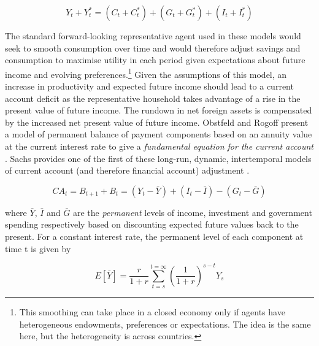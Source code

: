 \documentclass[12pt, a4paper, oneside]{article}\usepackage[]{graphicx}\usepackage[]{color}
\begin{document}
 \begin{equation} 
Y_t+Y^*_t=(C_t+C^*_t) + (G_t +G^*_t)+(I_t +I^*_t) 
\end{equation}

The standard forward-looking representative agent used in these models would seek to smooth consumption over time and would therefore adjust savings and consumption to maximise utility in each period given expectations about future income and evolving preferences.\footnote{This smoothing can take place in a closed economy only if agents have heterogeneous endowments, preferences or expectations.  The idea is the same here, but the heterogeneity is across countries.}  Given the assumptions of this model, an increase in productivity and expected future income should lead to a current account deficit as the representative household takes advantage of a rise in the present value of future income.  The rundown in net foreign assets is compensated by the increased net present value of future income.  Obstfeld and Rogoff present a model of permanent balance of payment components based on an annuity value at the current interest rate to give a \emph{fundamental equation for the current account} \citep[p. 74]{OandR}.
Sachs provides one of the first of these long-run, dynamic, intertemporal models of current account (and therefore financial account) adjustment \citep{SachsCA}.  

\begin{equation} 
CA_t=B_{t+1}+B_t=(Y_t-\bar{Y})+(I_t-\bar{I})-(G_t-\bar{G}) 
\end{equation} 

where $\bar{Y}$, $\bar{I}$ and $\bar{G}$ are the \emph{permanent} levels of income, investment and government spending respectively based on discounting expected future values back to the present. For a constant interest rate, the permanent level of each component at time t is given by   

 \begin{equation} 
E[\bar{Y}]=\frac{r}{1+r}\sum_{t=s}^{t=\infty}\left (\frac{1}{1+r}\right)^{s-t}Y_s 
\end{equation}
\end{document}
